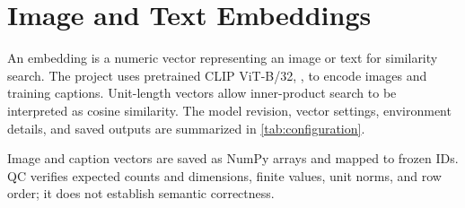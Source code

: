 \section{Image and Text Embeddings}
\label{ch:embeddings}

An embedding is a numeric vector representing an image or text for similarity search. The project uses pretrained CLIP ViT-B/32,  \citep{radford2021clip}, to encode images and training captions. Unit-length vectors allow inner-product search to be interpreted as cosine similarity. The model revision, vector settings, environment details, and saved outputs are summarized in \cref{tab:configuration}.

Image and caption vectors are saved as NumPy  arrays and mapped to frozen IDs. QC verifies expected counts and dimensions, finite values, unit norms, and row order; it does not establish semantic correctness.
